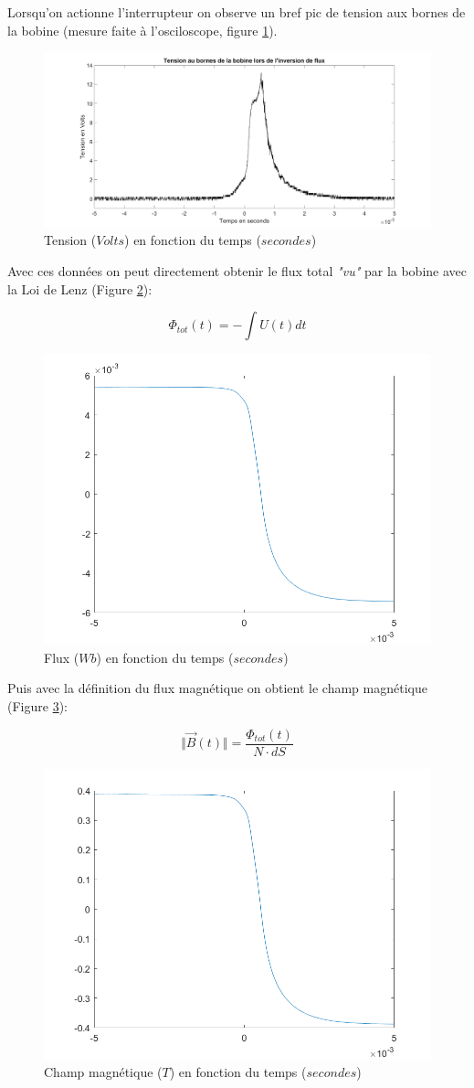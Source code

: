 \documentclass{rapportENS}
\begin{document}
 Lorsqu'on actionne l'interrupteur on observe un bref pic de tension aux bornes de la bobine (mesure faite à l'osciloscope, figure \ref{tensionobine}).
 
 \begin{figure}[h!]
 \includegraphics[width = .5\linewidth]{tension.png}
 \centering
 \caption{Tension ($Volts$) en fonction du temps ($secondes$)}
 \label{tensionobine}
 \end{figure}
 
 Avec ces données on peut directement obtenir le flux total \textit{"vu"} par la bobine avec la Loi de Lenz (Figure \ref{fluxobine}):
 
 \begin{equation}
 \Phi_{tot}(t) = -\int U(t) dt
 \end{equation}
 
 \begin{figure}[h!]
 \includegraphics[width = .5\linewidth]{flux.png}
 \centering
 \caption{Flux ($Wb$) en fonction du temps ($secondes$)}
 \label{fluxobine}
 \end{figure}
 
 Puis avec la définition du flux magnétique on obtient le champ magnétique (Figure \ref{champ}): 
 
 \begin{equation}
 \Vert \overrightarrow{B}(t) \Vert = \frac{\Phi_{tot}(t)}{N \cdot dS}
 \end{equation}
 
 \begin{figure}[h!]
 \includegraphics[width = .5\linewidth]{champmag.png}
 \centering
 \caption{Champ magnétique ($T$) en fonction du temps ($secondes$)}
 \label{champ}
 \end{figure}
 
\end{document}
